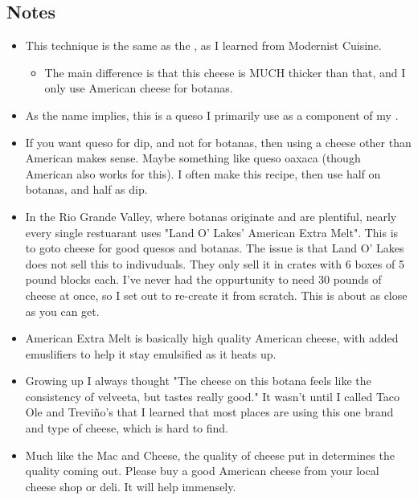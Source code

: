 \begin{multicols}{2}
\subsection*{Notes}
\begin{itemize}
    \item This technique is the same as the , as I learned from Modernist Cuisine.
    \begin{itemize}
        \item The main difference is that this cheese is MUCH thicker than that, and I only use American cheese for botanas.
    \end{itemize}
    \item As the name implies, this is a queso I primarily use as a component of my .
    \item If you want queso for dip, and not for botanas, then using a cheese other than American makes sense. Maybe something like queso oaxaca (though American also works for this). I often make this recipe, then use half on botanas, and half as dip.
    \item In the Rio Grande Valley, where botanas originate and are plentiful, nearly every single restuarant uses "Land O' Lakes' American Extra Melt". This is to goto cheese for good quesos and botanas. The issue is that Land O' Lakes does not sell this to indivuduals. They only sell it in crates with 6 boxes of 5 pound blocks each. I've never had the oppurtunity to need 30 pounds of cheese at once, so I set out to re-create it from scratch. This is about as close as you can get.
    \item American Extra Melt is basically high quality American cheese, with added emuslifiers to help it stay emulsified as it heats up.
    \item Growing up I always thought "The cheese on this botana feels like the consistency of velveeta, but tastes really good." It wasn't until I called Taco Ole and Treviño's that I learned that most places are using this one brand and type of cheese, which is hard to find.
    \item Much like the Mac and Cheese, the quality of cheese put in determines the quality coming out. Please buy a good American cheese from your local cheese shop or deli. It will help immensely.
\end{itemize}
\end{multicols}
\clearpage